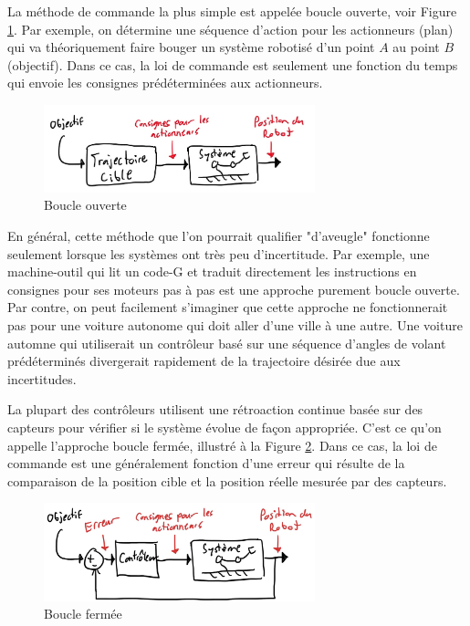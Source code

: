 La méthode de commande la plus simple est appelée boucle ouverte, voir Figure \ref{fig:openloop}. Par exemple, on détermine une séquence d'action pour les actionneurs (plan) qui va théoriquement faire bouger un système robotisé d'un point $A$ au point $B$ (objectif). Dans ce cas, la loi de commande est seulement une fonction du temps qui envoie les consignes prédéterminées aux actionneurs.
\begin{figure}[htbp]
	\centering
	\includegraphics[width=0.7\textwidth]{fig/openloop.jpg}
	\caption{Boucle ouverte}
	\label{fig:openloop}
\end{figure}

En général, cette méthode que l'on pourrait qualifier "d'aveugle" fonctionne seulement lorsque les systèmes ont très peu d'incertitude. Par exemple, une machine-outil qui lit un code-G et traduit directement les instructions en consignes pour ses moteurs pas à pas est une approche purement boucle ouverte. Par contre, on peut facilement s'imaginer que cette approche ne fonctionnerait pas pour une voiture autonome qui doit aller d'une ville à une autre. Une voiture automne qui utiliserait un contrôleur basé sur une séquence d'angles de volant prédéterminés divergerait rapidement de la trajectoire désirée due aux incertitudes.

La plupart des contrôleurs utilisent une rétroaction continue basée sur des capteurs pour vérifier si le système évolue de façon appropriée. C'est ce qu'on appelle l'approche boucle fermée,  illustré à la Figure \ref{fig:closedloop}. Dans ce cas, la loi de commande est une généralement fonction d'une erreur qui résulte de la comparaison de la position cible et la position réelle mesurée par des capteurs.
\begin{figure}[htbp]
	\centering
	\includegraphics[width=0.7\textwidth]{fig/closedloop.jpg}
	\caption{Boucle fermée}
	\label{fig:closedloop}
\end{figure}

